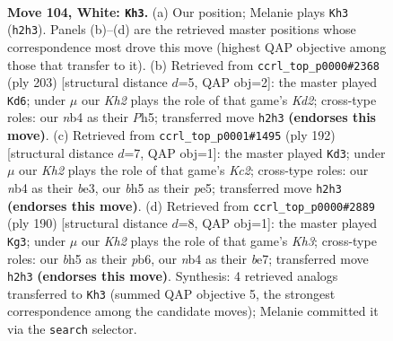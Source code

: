 \documentclass[11pt]{article}
\begin{document}
\clearpage

\begin{figure}[p]\centering
\begin{subfigure}{0.46\textwidth}\centering
\resizebox{\linewidth}{!}{%
\newchessgame
\chessboard[
  setfen={8/8/7k/7b/1n1B4/8/5P1K/8 w - - 53 104},
  showmover=false,
  pgfstyle=straightmove, color=movearrow, markmove={h2-h3}
]}
\caption{}
\end{subfigure}\hfill
\begin{subfigure}{0.46\textwidth}\centering
\resizebox{\linewidth}{!}{%
\newchessgame
\chessboard[
  setfen={8/3k4/p7/7p/7P/1KB5/8/5b2 b - - 33 102},
  showmover=false,
  pgfstyle=straightmove, color=movearrow, markmove={d7-d6}
]}
\caption{}
\end{subfigure}
\\[4pt]
\begin{subfigure}{0.46\textwidth}\centering
\resizebox{\linewidth}{!}{%
\newchessgame
\chessboard[
  setfen={2k5/8/8/3Bp3/8/4bP2/2K5/8 w - - 15 97},
  showmover=false,
  pgfstyle=straightmove, color=movearrow, markmove={c2-d3}
]}
\caption{}
\end{subfigure}\hfill
\begin{subfigure}{0.46\textwidth}\centering
\resizebox{\linewidth}{!}{%
\newchessgame
\chessboard[
  setfen={8/4b3/1p6/1P6/2B5/7K/8/6k1 w - - 5 96},
  showmover=false,
  pgfstyle=straightmove, color=movearrow, markmove={h3-g3}
]}
\caption{}
\end{subfigure}
\caption{\textbf{Move 104, White: \texttt{Kh3}.} (a) Our position; Melanie plays \texttt{Kh3} (\texttt{h2h3}). Panels (b)--(d) are the retrieved master positions whose correspondence most drove this move (highest QAP objective among those that transfer to it). (b) Retrieved from \texttt{ccrl\_top\_p0000\#2368} (ply 203) [structural distance $d$=5, QAP obj=2]: the master played \texttt{Kd6}; under $\mu$ our \emph{Kh2} plays the role of that game's \emph{Kd2}; cross-type roles: our \emph{n}b4 as their \emph{P}h5; transferred move \texttt{h2h3} \textbf{(endorses this move)}. (c) Retrieved from \texttt{ccrl\_top\_p0001\#1495} (ply 192) [structural distance $d$=7, QAP obj=1]: the master played \texttt{Kd3}; under $\mu$ our \emph{Kh2} plays the role of that game's \emph{Kc2}; cross-type roles: our \emph{n}b4 as their \emph{b}e3, our \emph{b}h5 as their \emph{p}e5; transferred move \texttt{h2h3} \textbf{(endorses this move)}. (d) Retrieved from \texttt{ccrl\_top\_p0000\#2889} (ply 190) [structural distance $d$=8, QAP obj=1]: the master played \texttt{Kg3}; under $\mu$ our \emph{Kh2} plays the role of that game's \emph{Kh3}; cross-type roles: our \emph{b}h5 as their \emph{p}b6, our \emph{n}b4 as their \emph{b}e7; transferred move \texttt{h2h3} \textbf{(endorses this move)}. Synthesis: 4 retrieved analogs transferred to \texttt{Kh3} (summed QAP objective 5, the strongest correspondence among the candidate moves); Melanie committed it via the \texttt{search} selector.}
\label{fig:thought-m206}
\end{figure}
\end{document}
